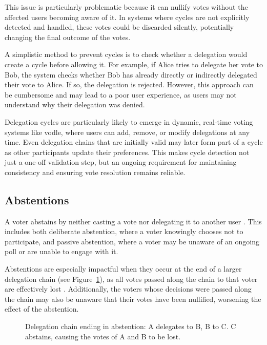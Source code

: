 This issue is particularly problematic because it can nullify votes without the affected users becoming aware of it. In systems where cycles are not explicitly detected and handled, these votes could be discarded silently, potentially changing the final outcome of the votes.

A simplistic method to prevent cycles is to check whether a delegation would create a cycle before allowing it. For example, if Alice tries to delegate her vote to Bob, the system checks whether Bob has already directly or indirectly delegated their vote to Alice. If so, the delegation is rejected. However, this approach can be cumbersome and may lead to a poor user experience, as users may not understand why their delegation was denied.

Delegation cycles are particularly likely to emerge in dynamic, real-time voting systems like vodle, where users can add, remove, or modify delegations at any time. Even delegation chains that are initially valid may later form part of a cycle as other participants update their preferences. This makes cycle detection not just a one-off validation step, but an ongoing requirement for maintaining consistency and ensuring vote resolution remains reliable.

\subsection*{Abstentions}

A voter abstains by neither casting a vote nor delegating it to another user \citep{brill_liquid_2022}. This includes both deliberate abstention, where a voter knowingly chooses not to participate, and passive abstention, where a voter may be unaware of an ongoing poll or are unable to engage with it.

Abstentions are especially impactful when they occur at the end of a larger delegation chain (see Figure~\ref{fig:delegation-abstention}), as all votes passed along the chain to that voter are effectively lost \citep{brill_liquid_2022}. Additionally, the voters whose decisions were passed along the chain may also be unaware that their votes have been nullified, worsening the effect of the abstention.

\begin{figure}[H]
  \centering
  \caption{Delegation chain ending in abstention: A delegates to B, B to C. C abstains, causing the votes of A and B to be lost.}
  \label{fig:delegation-abstention}
\end{figure}

